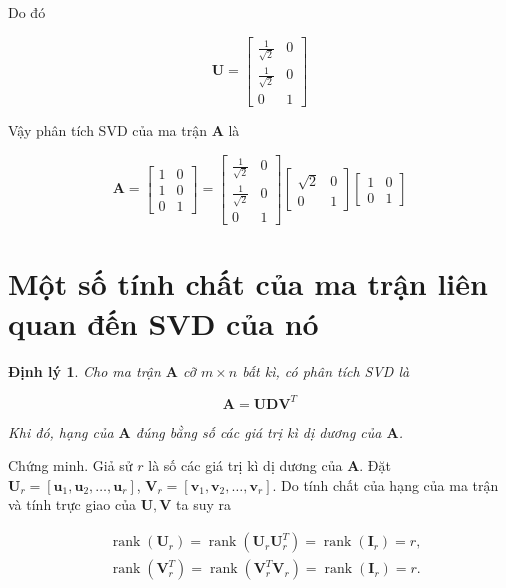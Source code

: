 \documentclass[12pt,a4paper,oneside]{report}
\newtheorem{dl}{Định lý}[section]
\numberwithin{equation}{section}
\begin{document}
Do đó

$$
\mathbf{U}=\left[\begin{array}{cc}
	\frac{1}{\sqrt{2}} & 0 \\
	\frac{1}{\sqrt{2}} & 0 \\
	0 & 1
\end{array}\right]
$$

Vậy phân tích SVD của ma trận $\mathbf{A}$ là

$$
\mathbf{A}=\left[\begin{array}{ll}
	1 & 0 \\
	1 & 0 \\
	0 & 1
\end{array}\right]=\left[\begin{array}{cc}
	\frac{1}{\sqrt{2}} & 0 \\
	\frac{1}{\sqrt{2}} & 0 \\
	0 & 1
\end{array}\right]\left[\begin{array}{cc}
	\sqrt{2} & 0 \\
	0 & 1
\end{array}\right]\left[\begin{array}{ll}
	1 & 0 \\
	0 & 1
\end{array}\right]
$$

\section{Một số tính chất của ma trận liên quan đến SVD của nó}
\begin{dl}
Cho ma trận $\mathbf{A}$ cỡ $m \times n$ bất kì, có phân tích SVD là

$$
\mathbf{A}=\mathbf{U D V}^{T}
$$

Khi đó, hạng của $\mathbf{A}$ đúng bằng số các giá trị kì dị dương của $\mathbf{A}$.
\end{dl}
Chứng minh. Giả sử $r$ là số các giá trị kì dị dương của $\mathbf{A}$. Đặt $\mathbf{U}_{r}=\left[\mathbf{u}_{1}, \mathbf{u}_{2}, \ldots, \mathbf{u}_{r}\right]$, $\mathbf{V}_{r}=\left[\mathbf{v}_{1}, \mathbf{v}_{2}, \ldots, \mathbf{v}_{r}\right]$. Do tính chất của hạng của ma trận và tính trực giao của $\mathbf{U}, \mathbf{V}$ ta suy ra

$$
\begin{aligned}
	& \operatorname{rank}\left(\mathbf{U}_{r}\right)=\operatorname{rank}\left(\mathbf{U}_{r} \mathbf{U}_{r}^{T}\right)=\operatorname{rank}\left(\mathbf{I}_{r}\right)=r, \\
	& \operatorname{rank}\left(\mathbf{V}_{r}^{T}\right)=\operatorname{rank}\left(\mathbf{V}_{r}^{T} \mathbf{V}_{r}\right)=\operatorname{rank}\left(\mathbf{I}_{r}\right)=r .
\end{aligned}
$$
\end{document}
